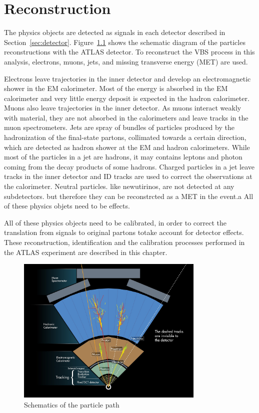 \chapter{Reconstruction}
\label{chap:reconstruction}
The physics objects are detected as signals in each detector described in Section~\ref{sec:detector}.
Figure~\ref{fig:ParticlePath} shows the schematic diagram of the particles reconstructions with the ATLAS detector. 
To reconstruct the VBS process in this analysis, electrons, muons, jets, and missing transverse energy (MET) are used.

Electrons leave trajectories in the inner detector and develop an electromagnetic shower in the EM calorimeter. Most of the energy is absorbed in the EM calorimeter and very little energy deposit is expected in the hadron calorimeter.
Muons also leave trajectories in the inner detector. As muons interact weakly with material, they are not absorbed in the calorimeters and leave tracks in the muon spectrometers.
Jets are spray of bundles of particles produced by the hadronization of the final-state partons, collimated towards a certain direction, which are detected as hadron shower at the EM and hadron calorimeters. While most of the particles in a jet are hadrons, it may contains leptons and photon coming from the decay products of some hadrons. Charged particles in a jet leave tracks in the inner detector and ID tracks are used to correct the observations at the calorimeter. Neutral particles. like newutirinos, are not detected at any subdetectors. but therefore they can be reconstrcted as a MET in the event.a All of these physics objets need to be effects. 

All of these physics objects need to be calibrated, in order to correct the translation from signals to original partons totake account for detector effects.
These reconstruction, identification and the calibration processes performed in the ATLAS experiment are described in this chapter.
\begin{figure}[tbp]
\begin{center}
 \includegraphics[width=0.80\textwidth,keepaspectratio]{figures/Reconstruction/ParticlePath}
\caption{
Schematics of the particle path
}
\label{fig:ParticlePath}
\end{center}
\end{figure}

